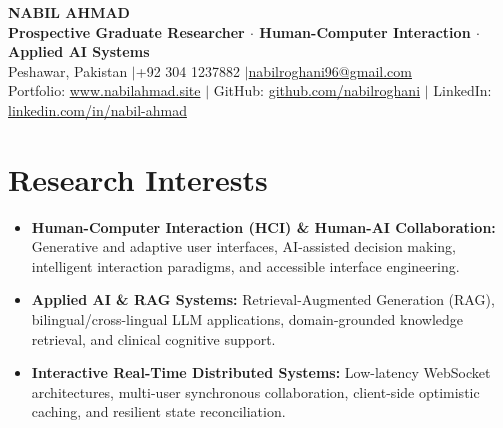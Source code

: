 \documentclass[10pt,a4paper]{article}
\begin{document}
\pagestyle{empty}

\begin{center}
    {\Huge \textbf{NABIL AHMAD}} \\[4pt]
    \textbf{Prospective Graduate Researcher $\cdot$ Human-Computer Interaction $\cdot$ Applied AI Systems} \\[3pt]
    Peshawar, Pakistan \quad$|$\quad +92 304 1237882 \quad$|$\quad \href{mailto:nabilroghani96@gmail.com}{nabilroghani96@gmail.com} \\[2pt]
    Portfolio: \href{https://www.nabilahmad.site}{www.nabilahmad.site} \quad$|$\quad
    GitHub: \href{https://github.com/nabilroghani}{github.com/nabilroghani} \quad$|$\quad
    LinkedIn: \href{https://linkedin.com/in/nabil-ahmad-0750002b1}{linkedin.com/in/nabil-ahmad}
\end{center}

\section{Research Interests}
\begin{itemize}
    \item \textbf{Human-Computer Interaction (HCI) \& Human-AI Collaboration:} Generative and adaptive user interfaces, AI-assisted decision making, intelligent interaction paradigms, and accessible interface engineering.
    \item \textbf{Applied AI \& RAG Systems:} Retrieval-Augmented Generation (RAG), bilingual/cross-lingual LLM applications, domain-grounded knowledge retrieval, and clinical cognitive support.
    \item \textbf{Interactive Real-Time Distributed Systems:} Low-latency WebSocket architectures, multi-user synchronous collaboration, client-side optimistic caching, and resilient state reconciliation.
\end{itemize}

\end{document}
